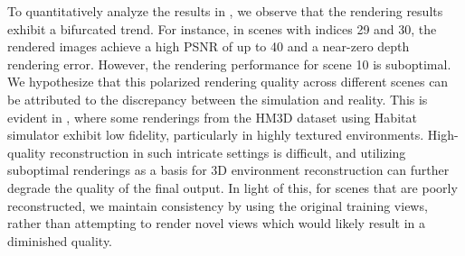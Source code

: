 To quantitatively analyze the results in , we observe that the rendering results exhibit a bifurcated trend. For instance, in scenes with indices 29 and 30, the rendered images achieve a high PSNR of up to 40 and a near-zero depth rendering error. However, the rendering performance for scene 10 is suboptimal. We hypothesize that this polarized rendering quality across different scenes can be attributed to the discrepancy between the simulation and reality. This is evident in , where some renderings from the HM3D dataset using Habitat simulator exhibit low fidelity, particularly in highly textured environments. High-quality reconstruction in such intricate settings is difficult, and utilizing suboptimal renderings as a basis for 3D environment reconstruction can further degrade the quality of the final output. In light of this, for scenes that are poorly reconstructed, we maintain consistency by using the original training views, rather than attempting to render novel views which would likely result in a diminished quality.







